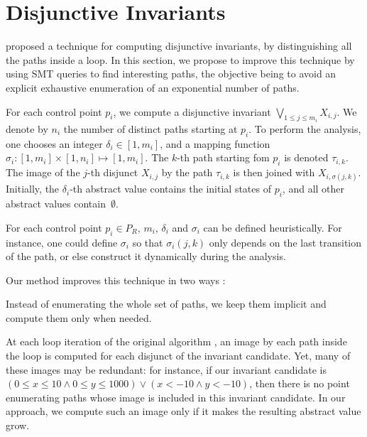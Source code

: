 \documentclass{llncs}
\begin{document}
\section{Disjunctive Invariants}
\label{sec:disjunctive}

\cite{DBLP:conf/pldi/GulwaniZ10} proposed a technique for computing disjunctive invariants, by
distinguishing all the paths inside a loop. In
this section, we propose to improve this technique by using SMT queries to find
interesting paths, the objective being to avoid an explicit exhaustive
enumeration of an exponential number of paths.

For each control point $p_i$, we compute a disjunctive invariant
$\bigvee_{1\leq j \leq m_i} X_{i,j}$. We denote by $n_i$ the number of
distinct paths starting at $p_i$.
To perform the analysis, one chooses an integer $\delta_i \in [1,m_i]$, and
a mapping function $\sigma_i: [1,m_i] \times [1,n_i] \mapsto [1,m_i]$.
  The $k$-th path starting fom $p_i$ is denoted $\tau_{i,k}$.
  The image of the $j$-th disjunct $X_{i,j}$ by the path $\tau_{i,k}$ is then
  joined with $X_{i,\sigma(j,k)}$.
Initially, the $\delta_i$-th abstract value contains the initial states of
$p_i$, and all other abstract values contain~$\emptyset$.

For each control point $p_i \in P_R$, $m_i$, $\delta_i$ and $\sigma_i$ can be defined heuristically.
For instance, one could define $\sigma_i$ so that $\sigma_i(j,k)$ only depends on the
last transition of the path, or else construct it dynamically during the
analysis.

Our method improves this technique in two ways :
\begin{compactitem}
\item Instead of enumerating the whole set of paths, we keep them implicit and
compute them only when needed.

\item At each loop iteration of the original algorithm \cite{DBLP:conf/pldi/GulwaniZ10}, an image by each path inside the loop is computed for each disjunct of the invariant candidate.
Yet, many of these images may be redundant: for instance, if our invariant candidate is $(0 \leq x \leq 10 \land 0 \leq y \leq 1000) \lor (x < -10 \land y < -10)$, then there is no point enumerating paths whose image is included in this invariant candidate.
In our approach, we compute such an image only if it makes the resulting abstract value grow.
\end{compactitem}
\end{document}
